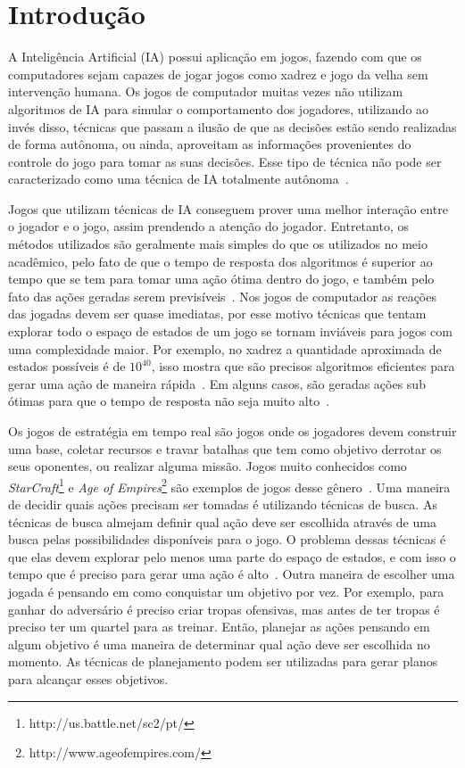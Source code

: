 \chapter{\label{chap:intro}Introdução}

A Inteligência Artificial (IA) possui aplicação em jogos, fazendo com que os computadores sejam capazes de jogar jogos como xadrez e jogo da velha sem intervenção humana. 
Os jogos de computador muitas vezes não utilizam algoritmos de IA para simular o comportamento dos jogadores, utilizando ao invés disso, técnicas que passam a ilusão de que as decisões estão sendo realizadas de forma autônoma, ou ainda, aproveitam as informações provenientes do controle do jogo para tomar as suas decisões. Esse tipo de técnica não pode ser caracterizado como uma técnica de IA totalmente autônoma~\cite{millington2009artificial}.

Jogos que utilizam técnicas de IA conseguem prover uma melhor interação entre o jogador e o jogo, assim prendendo a atenção do jogador.
Entretanto, os métodos utilizados são geralmente mais simples do que os utilizados no meio acadêmico, pelo fato de que o tempo de resposta dos algoritmos é superior ao tempo que se tem para tomar uma ação ótima dentro do jogo, e também pelo fato das ações geradas serem previsíveis~\cite{millington2009artificial}.
Nos jogos de computador as reações das jogadas devem ser quase imediatas, por esse motivo técnicas que tentam explorar todo o espaço de estados de um jogo se tornam inviáveis para jogos com uma complexidade maior.
Por exemplo, no xadrez a quantidade aproximada de estados possíveis é de $10^{40}$, isso mostra que são precisos algoritmos eficientes para gerar uma ação de maneira rápida~\cite{millington2009artificial}. 
Em alguns casos, são geradas ações sub ótimas para que o tempo de resposta não seja muito alto~\cite[Capítulo 3]{intelligence2003modern}. 

Os jogos de estratégia em tempo real são jogos onde os jogadores devem construir uma base, coletar recursos e travar batalhas que tem como objetivo derrotar os seus oponentes, ou realizar alguma missão.
Jogos muito conhecidos como \textit{StarCraft}\footnote{http://us.battle.net/sc2/pt/} e \textit{Age of Empires}\footnote{http://www.ageofempires.com/} são exemplos de jogos desse gênero~\cite{ontanon2013survey}.
Uma maneira de decidir quais ações precisam ser tomadas é utilizando técnicas de busca.
As técnicas de busca almejam definir qual ação deve ser escolhida através de uma busca pelas possibilidades disponíveis para o jogo. 
O problema dessas técnicas é que elas devem explorar pelo menos uma parte do espaço de estados, e com isso o tempo que é preciso para gerar uma ação é alto~\cite{ontanon2012minimax}.
Outra maneira de escolher uma jogada é pensando em como conquistar um objetivo por vez.
Por exemplo, para ganhar do adversário é preciso criar tropas ofensivas, mas antes de ter tropas é preciso ter um quartel para as treinar.
Então, planejar as ações pensando em algum objetivo é uma maneira de determinar qual ação deve ser escolhida no momento. 
As técnicas de planejamento podem ser utilizadas para gerar planos para alcançar esses objetivos. 

